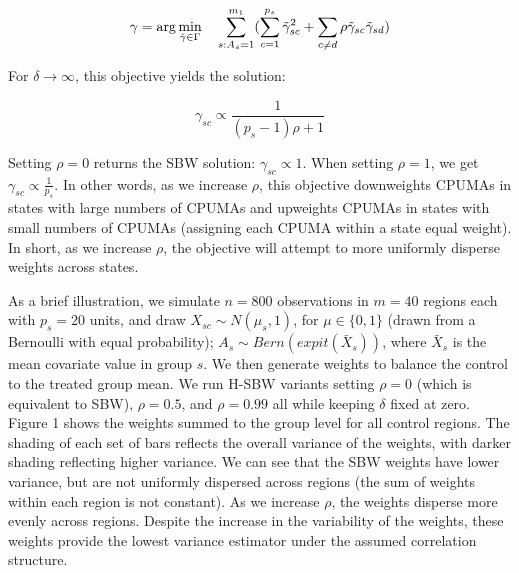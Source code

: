 \documentclass[aoas]{imsart}
\theoremstyle{plain}
\theoremstyle{remark}
\begin{document}
\begin{equation}\label{eqn:objective}
\gamma = \arg\min_{\tilde{\gamma} \in \Gamma} \quad \sum_{s: A_s = 1}^{m_1}(\sum_{c = 1}^{p_s} \tilde{\gamma}_{sc}^2 + \sum_{c \ne d}\rho \tilde{\gamma}_{sc}\tilde{\gamma}_{sd})\\
\end{equation}

For $\delta \to \infty$, this objective yields the solution:

\begin{equation}\label{eqn:sbwsol}
\gamma_{sc} \propto \frac{1}{(p_s - 1)\rho + 1}
\end{equation}

Setting $\rho = 0$ returns the SBW solution: $\gamma_{sc} \propto 1$. When setting $\rho = 1$, we get $\gamma_{sc} \propto \frac{1}{p_s}$. In other words, as we increase $\rho$, this objective downweights CPUMAs in states with large numbers of CPUMAs and upweights CPUMAs in states with small numbers of CPUMAs (assigning each CPUMA within a state equal weight). In short, as we increase $\rho$, the objective will attempt to more uniformly disperse weights across states.

As a brief illustration, we simulate $n = 800$ observations in $m = 40$ regions each with $p_s = 20$ units, and draw $X_{sc} \sim N(\mu_s, 1)$, for $\mu \in \{0, 1\}$ (drawn from a Bernoulli with equal probability); $A_s \sim Bern(expit(\bar{X}_s))$, where $\bar{X}_s$ is the mean covariate value in group $s$. We then generate weights to balance the control to the treated group mean. We run H-SBW variants setting $\rho = 0$ (which is equivalent to SBW), $\rho = 0.5$, and $\rho = 0.99$ all while keeping $\delta$ fixed at zero. Figure 1 shows the weights summed to the group level for all control regions. The shading of each set of bars reflects the overall variance of the weights, with darker shading reflecting higher variance. We can see that the SBW weights have lower variance, but are not uniformly dispersed across regions (the sum of weights within each region is not constant). As we increase $\rho$, the weights disperse more evenly across regions. Despite the increase in the variability of the weights, these weights provide the lowest variance estimator under the assumed correlation structure. 
\end{document}
